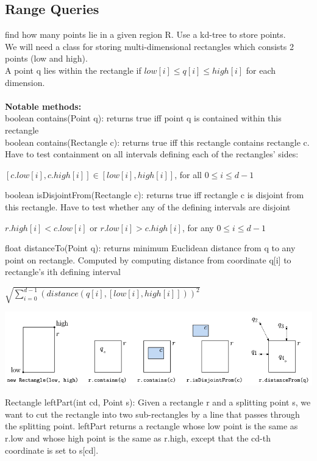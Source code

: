 \documentclass{article}
\begin{document}
  \subsection{Range Queries} 
  find how many points lie in a given region R. Use a kd-tree to store points. \\
  We will need a class for storing multi-dimensional rectangles which consists 2 points (low and high). \\
  A point q lies within the rectangle if $low[i] \leq q[i] \leq high[i]$ for each dimension.\\ \\
  \textbf{Notable methods:}\\ 
  boolean contains(Point q): returns true iff point q is contained within this rectangle\\
  boolean contains(Rectangle c): returns true iff this rectangle contains rectangle c. Have to test containment on all intervals defining each of the rectangles' sides:
  \begin{center}
    $[c.low[i],c.high[i]] \in [low[i], high[i]]$, for all $0 \leq i \leq d - 1$
  \end{center}
  boolean isDisjointFrom(Rectangle c): returns true iff rectangle c is disjoint from this rectangle. Have to test whether any of the defining intervals are disjoint
  \begin{center}
    $r.high[i] < c.low[i]$ or $r.low[i] > c.high[i]$, for any $0 \leq i \leq d-1$
  \end{center}
  float distanceTo(Point q): returns minimum Euclidean distance from q to any point on rectangle. Computed by computing distance from coordinate q[i] to rectangle's ith defining interval
  \begin{center}
    $\sqrt{\sum_{i=0}^{d-1}(distance(q[i], [low[i], high[i]]))^{2}}$
  \end{center}
  \begin{center}
  \includegraphics[scale=0.4]{RangeQueriesMethods}
  \end{center}
  Rectangle leftPart(int cd, Point s): Given a rectangle r and a splitting point s, we want to cut the rectangle into two sub-rectangles by a line that passes through the splitting point. leftPart returns a rectangle whose low point is the same as r.low and whose high point is the same as r.high, except that the cd-th coordinate is set to s[cd].
\end{document}
